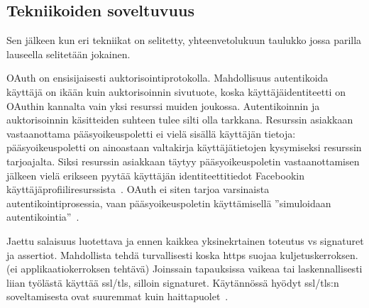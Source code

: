 \documentclass[finnish,gradu]{tktltiki}
\begin{document}



  \subsection{Tekniikoiden soveltuvuus} %
  \label{sub:tekniikoiden_yhtäläisyydet}

  Sen jälkeen kun eri tekniikat on selitetty, yhteenvetolukuun taulukko jossa parilla lauseella selitetään jokainen.

  OAuth on ensisijaisesti auktorisointiprotokolla. Mahdollisuus autentikoida käyttäjä on ikään kuin auktorisoinnin sivutuote, koska käyttäjäidentiteetti on OAuthin kannalta vain yksi resurssi muiden joukossa. Autentikoinnin ja auktorisoinnin käsitteiden suhteen tulee silti olla tarkkana. Resurssin asiakkaan vastaanottama pääsyoikeuspoletti ei vielä sisällä käyttäjän tietoja: pääsyoikeuspoletti on ainoastaan valtakirja käyttäjätietojen kysymiseksi resurssin tarjoajalta. Siksi resurssin asiakkaan täytyy pääsyoikeuspoletin vastaanottamisen jälkeen vielä erikseen pyytää käyttäjän identiteettitiedot Facebookin käyttäjäprofiiliresurssista~\cite{facebook_graph_api_user}. OAuth ei siten tarjoa varsinaista autentikointiprosessia, vaan pääsyoikeuspoletin käyttämisellä ''simuloidaan autentikointia''~\cite{sakimura_dummydiff_oauth_openid_2011}.


  Jaettu salaisuus luotettava ja ennen kaikkea yksinekrtainen toteutus vs signaturet ja assertiot. Mahdollista tehdä turvallisesti koska https suojaa kuljetuskerroksen. (ei applikaatiokerroksen tehtävä) Joinssain tapauksissa vaikeaa tai laskennallisesti liian työlästä käyttää ssl/tls, silloin signaturet. Käytännössä hyödyt ssl/tls:n soveltamisesta ovat suuremmat kuin haittapuolet~\cite{oauthwg_ssl_discussion_2010}.
\end{document}
